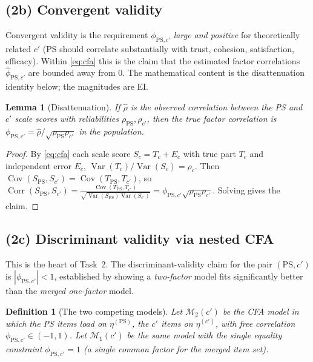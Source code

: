 \documentclass{amsart}
\newtheorem{lemma}{Lemma}
\newtheorem{definition}{Definition}
\theoremstyle{remark}
\begin{document}
\subsection{(2b) Convergent validity}
Convergent validity is the requirement $\phi_{\mathrm{PS},c'}$ \emph{large and
positive} for theoretically related $c'$ (PS should correlate substantially with
trust, cohesion, satisfaction, efficacy). Within \eqref{eq:cfa} this is the claim
that the estimated factor correlations $\hat\phi_{\mathrm{PS},c'}$ are bounded away
from $0$. The mathematical content is the disattenuation identity below; the
magnitudes are EI.

\begin{lemma}[Disattenuation]\label{lem:disatt}
If $\hat\rho$ is the observed correlation between the PS and $c'$ \emph{scale
scores} with reliabilities $\rho_{\mathrm{PS}},\rho_{c'}$, then the true
factor correlation is $\phi_{\mathrm{PS},c'}=\hat\rho/\sqrt{\rho_{\mathrm{PS}}\rho_{c'}}$
in the population.
\end{lemma}
\begin{proof}
By \eqref{eq:cfa} each scale score $S_c=T_c+E_c$ with true part $T_c$ and
independent error $E_c$, $\operatorname{Var}(T_c)/\operatorname{Var}(S_c)=\rho_c$. Then
$\operatorname{Cov}(S_{\mathrm{PS}},S_{c'})=\operatorname{Cov}(T_{\mathrm{PS}},T_{c'})$, so
$\operatorname{Corr}(S_{\mathrm{PS}},S_{c'})=\frac{\operatorname{Cov}(T_{\mathrm{PS}},T_{c'})}{\sqrt{\operatorname{Var}(S_{\mathrm{PS}})\operatorname{Var}(S_{c'})}}
=\phi_{\mathrm{PS},c'}\sqrt{\rho_{\mathrm{PS}}\rho_{c'}}$. Solving gives the claim. \end{proof}

\subsection{(2c) Discriminant validity via nested CFA}\label{sec:disc}
This is the heart of Task~2. The discriminant-validity claim for the pair
$(\mathrm{PS},c')$ is $|\phi_{\mathrm{PS},c'}|<1$, established by showing a
\emph{two-factor} model fits significantly better than the \emph{merged
one-factor} model.

\begin{definition}[The two competing models]
Let $\mathcal M_2(c')$ be the CFA model in which the PS items load on $\eta^{(\mathrm{PS})}$,
the $c'$ items on $\eta^{(c')}$, with free correlation $\phi_{\mathrm{PS},c'}\in(-1,1)$.
Let $\mathcal M_1(c')$ be the same model with the single equality constraint
$\phi_{\mathrm{PS},c'}=1$ (a single common factor for the merged item set).
\end{definition}
\end{document}
